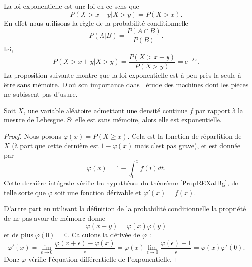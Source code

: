 La loi exponentielle est une loi  en ce sens que
\begin{equation}
    P(X>x+y|X>y)=P(X>x).
\end{equation}
En effet nous utilisons la règle de la probabilité conditionnelle
\begin{equation}
    P(A|B)=\frac{ P(A\cap B) }{ P(B) }.
\end{equation}
Ici,
\begin{equation}
    P(X>x+y|X>y)=\frac{ P(X>x+y) }{ P(X>y) }= e^{-\lambda x}.
\end{equation}
La proposition suivante montre que la loi exponentielle est à peu près la seule à être sans mémoire. D'où son importance dans l'étude des machines dont les pièces ne subissent pas d'usure.

\begin{proposition} \label{PropREXaIBg}
    Soit \( X\), une variable aléatoire admettant une densité continue \( f\) par rapport à la mesure de Lebesgue. Si elle est sans mémoire, alors elle est exponentielle.
\end{proposition}

\begin{proof}
    Nous posons \( \varphi(x)=P(X\geq x)\). Cela est la fonction de répartition de \( X\) (à part que cette dernière est \( 1-\varphi(x)\) mais c'est pas grave), et est donnée par
    \begin{equation}
        \varphi(x)=1-\int_0^xf(t)dt.
    \end{equation}
    Cette dernière intégrale vérifie les hypothèses du théorème \ref{PropREXaIBg}, de telle sorte que \( \varphi\) soit une fonction dérivable et \( \varphi'(x)=f(x)\).
    
    D'autre part en utilisant la définition de la probabilité conditionnelle la propriété de ne pas avoir de mémoire donne
    \begin{equation}
        \varphi(x+y)=\varphi(x)\varphi(y)
    \end{equation}
    et de plus \( \varphi(0)=0\). Calculons la dérivée de \( \varphi\) :
    \begin{equation}
        \varphi'(x)=\lim_{\epsilon\to 0}\frac{ \varphi(x+\epsilon)-\varphi(x) }{ \epsilon }=\varphi(x)\lim_{\epsilon\to 0}\frac{ \varphi(\epsilon)-1 }{ \epsilon }=\varphi(x)\varphi'(0).
    \end{equation}
    Donc \( \varphi\) vérifie l'équation différentielle de l'exponentielle.
    
\end{proof}

